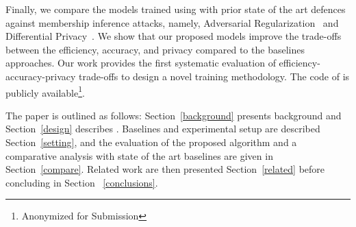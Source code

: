 

Finally, we compare the models trained using \method\hspace{0.02in} with prior state of the art defences against membership inference attacks, namely, Adversarial Regularization~\cite{DBLP:conf/ccs/NasrSH18} and Differential Privacy~\cite{Abadi:2016:DLD:2976749.2978318}.
We show that our proposed models improve the trade-offs between the efficiency, accuracy, and privacy compared to the baselines approaches.
Our work provides the first systematic evaluation of efficiency-accuracy-privacy trade-offs to design a novel training methodology.
The code of \method\hspace{0.02in} is publicly available\footnote{Anonymized for Submission}.


The paper is outlined as follows: Section~\ref{background} presents background and Section~\ref{design} describes \method\hspace{0.02in}.
Baselines and experimental setup are described Section~\ref{setting}, and the evaluation of the proposed algorithm and a comparative analysis with state of the art baselines are given in Section~\ref{compare}. Related work are then presented Section~\ref{related} before concluding in Section ~\ref{conclusions}.









